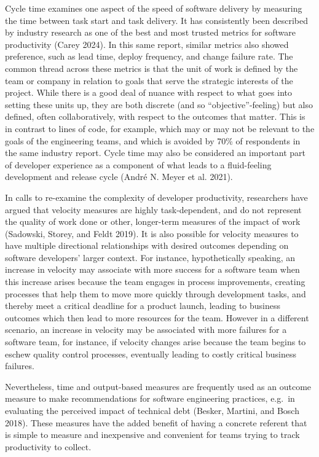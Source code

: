\documentclass[
]{article}
\begin{document}
Cycle time examines one aspect of the speed of software delivery by
measuring the time between task start and task delivery. It has
consistently been described by industry research as one of the best and
most trusted metrics for software productivity (Carey 2024). In this
same report, similar metrics also showed preference, such as lead time,
deploy frequency, and change failure rate. The common thread across
these metrics is that the unit of work is defined by the team or company
in relation to goals that serve the strategic interests of the project.
While there is a good deal of nuance with respect to what goes into
setting these units up, they are both discrete (and so
``objective''-feeling) but also defined, often collaboratively, with
respect to the outcomes that matter. This is in contrast to lines of
code, for example, which may or may not be relevant to the goals of the
engineering teams, and which is avoided by 70\% of respondents in the
same industry report. Cycle time may also be considered an important
part of developer experience as a component of what leads to a
fluid-feeling development and release cycle (André N. Meyer et al.
2021).

In calls to re-examine the complexity of developer productivity,
researchers have argued that velocity measures are highly
task-dependent, and do not represent the quality of work done or other,
longer-term measures of the impact of work (Sadowski, Storey, and Feldt
2019). It is also possible for velocity measures to have multiple
directional relationships with desired outcomes depending on software
developers' larger context. For instance, hypothetically speaking, an
increase in velocity may associate with more success for a software team
when this increase arises because the team engages in process
improvements, creating processes that help them to move more quickly
through development tasks, and thereby meet a critical deadline for a
product launch, leading to business outcomes which then lead to more
resources for the team. However in a different scenario, an increase in
velocity may be associated with more failures for a software team, for
instance, if velocity changes arise because the team begins to eschew
quality control processes, eventually leading to costly critical
business failures.

Nevertheless, time and output-based measures are frequently used as an
outcome measure to make recommendations for software engineering
practices, e.g.~in evaluating the perceived impact of technical debt
(Besker, Martini, and Bosch 2018). These measures have the added benefit
of having a concrete referent that is simple to measure and inexpensive
and convenient for teams trying to track productivity to collect.
\end{document}
